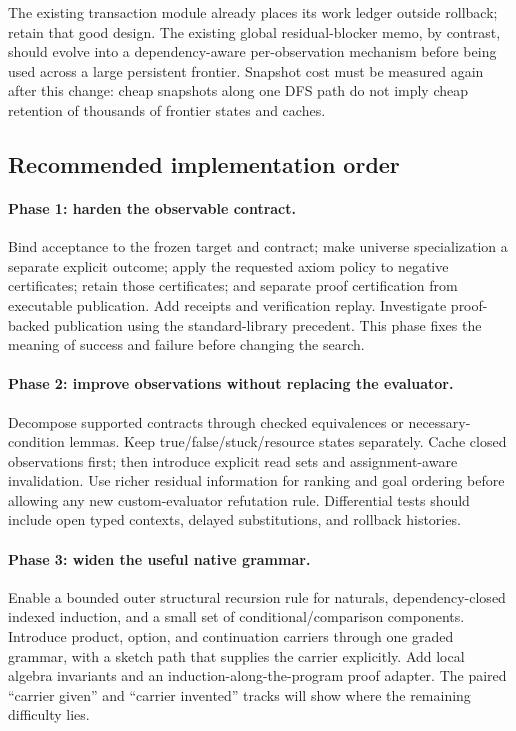The existing transaction module already places its work ledger outside rollback; retain that good design. The existing global residual-blocker memo, by contrast, should evolve into a dependency-aware per-observation mechanism before being used across a large persistent frontier. Snapshot cost must be measured again after this change: cheap snapshots along one DFS path do not imply cheap retention of thousands of frontier states and caches.\cite{implementation}

\subsection{Recommended implementation order}

\paragraph{Phase 1: harden the observable contract.}
Bind acceptance to the frozen target and contract; make universe specialization a separate explicit outcome; apply the requested axiom policy to negative certificates; retain those certificates; and separate proof certification from executable publication. Add receipts and verification replay. Investigate proof-backed  publication using the standard-library precedent. This phase fixes the meaning of success and failure before changing the search.

\paragraph{Phase 2: improve observations without replacing the evaluator.}
Decompose supported contracts through checked equivalences or necessary-condition lemmas. Keep true/false/stuck/resource states separately. Cache closed observations first; then introduce explicit read sets and assignment-aware invalidation. Use richer residual information for ranking and goal ordering before allowing any new custom-evaluator refutation rule. Differential tests should include open typed contexts, delayed substitutions, and rollback histories.

\paragraph{Phase 3: widen the useful native grammar.}
Enable a bounded outer structural recursion rule for naturals, dependency-closed indexed induction, and a small set of conditional/comparison components. Introduce product, option, and continuation carriers through one graded grammar, with a sketch path that supplies the carrier explicitly. Add local algebra invariants and an induction-along-the-program proof adapter. The paired ``carrier given'' and ``carrier invented'' tracks will show where the remaining difficulty lies.

